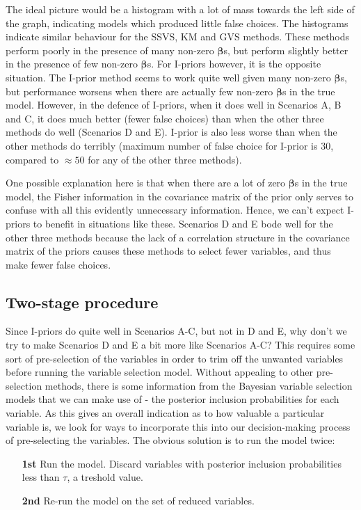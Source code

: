 The ideal picture would be a histogram with a lot of mass towards the left side of the graph, indicating models which produced little false choices. The histograms indicate similar behaviour for the SSVS, KM and GVS methods. These methods perform poorly in the presence of many non-zero $\boldsymbol\beta$s, but perform slightly better in the presence of few non-zero $\boldsymbol\beta$s. For I-priors however, it is the opposite situation. The I-prior method seems to work quite well given many non-zero $\boldsymbol\beta$s, but performance worsens when there are actually few non-zero $\boldsymbol\beta$s in the true model. However, in the defence of I-priors, when it does well in Scenarios A, B and C, it does much better (fewer false choices) than when the other three methods do well (Scenarios D and E). I-prior is also less worse than when the other methods do terribly (maximum number of false choice for I-prior is 30, compared to $\approx50$ for any of the other three methods).

One possible explanation here is that when there are a lot of zero $\boldsymbol\beta$s in the true model, the Fisher information in the covariance matrix of the prior only serves to confuse with all this evidently unnecessary information. Hence, we can't expect I-priors to benefit in situations like these. Scenarios D and E bode well for the other three methods because the lack of a correlation structure in the covariance matrix of the priors causes these methods to select fewer variables, and thus make fewer false choices.

\subsection{Two-stage procedure}

Since I-priors do quite well in Scenarios A-C, but not in D and E, why don't we try to make Scenarios D and E a bit more like Scenarios A-C? This requires some sort of pre-selection of the variables in order to trim off the unwanted variables before running the variable selection model. Without appealing to other pre-selection methods, there is some information from the Bayesian variable selection models that we can make use of - the posterior inclusion probabilities for each variable. As this gives an overall indication as to how valuable a particular variable is, we look for ways to incorporate this into our decision-making process of pre-selecting the variables. The obvious solution is to run the model twice:
\begin{itemize}
	\item [\textbf{1st}] Run the model. Discard variables with posterior inclusion probabilities less than $\tau$, a treshold value.
	\item [\textbf{2nd}] Re-run the model on the set of reduced variables.
\end{itemize}

